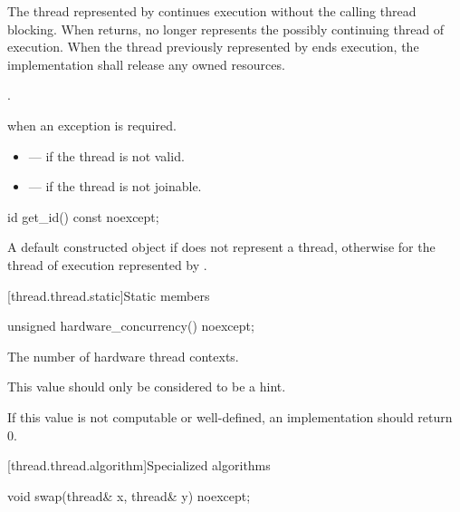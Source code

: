 \begin{itemdescr}
\pnum
\effects The thread represented by  continues execution without the calling thread
blocking. When  returns,  no longer represents the possibly continuing
thread of execution. When the thread previously represented by  ends execution, the
implementation shall release any owned resources.

\pnum\ensures {}.

\pnum\throws {} when
an exception is required.

\pnum \errors
\begin{itemize}
\item {} --- if the thread is not valid.
\item {} --- if the thread is not joinable.
\end{itemize}
\end{itemdescr}

%
\begin{itemdecl}
id get_id() const noexcept;
\end{itemdecl}

\begin{itemdescr}
\pnum
\returns A default constructed  object if  does not represent a thread,
otherwise  for the thread of execution represented by
.
\end{itemdescr}

[thread.thread.static]{Static members}

%
\begin{itemdecl}
unsigned hardware_concurrency() noexcept;
\end{itemdecl}

\begin{itemdescr}
\pnum
\returns The number of hardware thread contexts. \begin{note} This value should
only be considered to be a hint. \end{note} If this value is not computable or
well-defined, an implementation should return 0.
\end{itemdescr}

[thread.thread.algorithm]{Specialized algorithms}

%
\begin{itemdecl}
void swap(thread& x, thread& y) noexcept;
\end{itemdecl}

